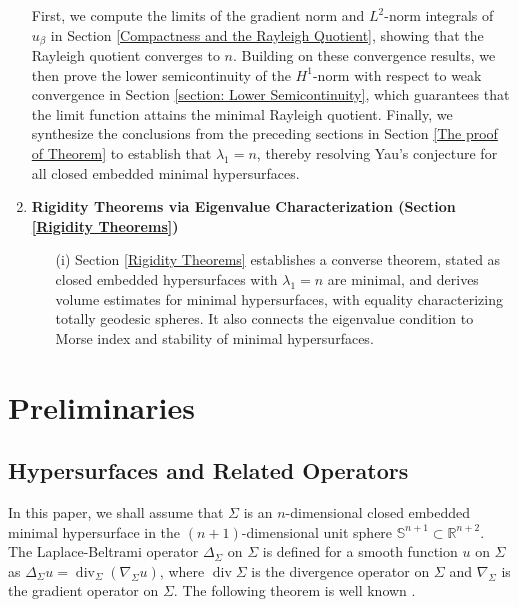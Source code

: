 \documentclass[a4, 12pt]{amsart}
\numberwithin{equation}{section} \numberwithin{equation}{section}
\begin{document}
\begin{enumerate}
   First, we compute the limits of the gradient norm and $L^2$-norm integrals of $u_\beta$ in Section \ref{Compactness and the Rayleigh Quotient}, showing that the Rayleigh quotient converges to $n$. Building on these convergence results, we then prove the lower semicontinuity of the $H^1$-norm with respect to weak convergence in Section \ref{section: Lower Semicontinuity}, which guarantees that the limit function attains the minimal Rayleigh quotient.
   Finally, we synthesize the conclusions from the preceding sections in Section \ref{The proof of Theorem}  to establish that $\lambda_1 = n$, thereby resolving Yau's conjecture for all closed embedded minimal hypersurfaces.
 \item \textbf{Rigidity Theorems via Eigenvalue Characterization (Section \ref{Rigidity Theorems})}
    \begin{itemize}
        \item[(i)] Section \ref{Rigidity Theorems} establishes a converse theorem, stated as closed embedded hypersurfaces with $\lambda_1 = n$ are minimal, and derives volume estimates for minimal hypersurfaces, with equality characterizing totally geodesic spheres. It also connects the eigenvalue condition to Morse index and stability of minimal hypersurfaces.
    \end{itemize}

\end{enumerate}










\section{Preliminaries}\label{section: Preliminaries}

\subsection{Hypersurfaces and Related Operators}

In this paper, we shall assume that $\Sigma$ is an $n$-dimensional closed embedded minimal hypersurface in the $(n+1)$-dimensional unit sphere $\mathbb{S}^{n+1} \subset \mathbb{R}^{n+2}$. The Laplace-Beltrami operator $\Delta_{\Sigma}$ on $\Sigma$ is defined for a smooth function $u$ on $\Sigma$ as $\Delta_{\Sigma} u=\operatorname{div} _{\Sigma}\left(\nabla_{\Sigma} u\right)$, where $\operatorname{div} \Sigma$ is the divergence operator on $\Sigma$ and $\nabla_{\Sigma}$ is the gradient operator on $\Sigma$. The following theorem is well known \cite{Tak}.
\end{document}
